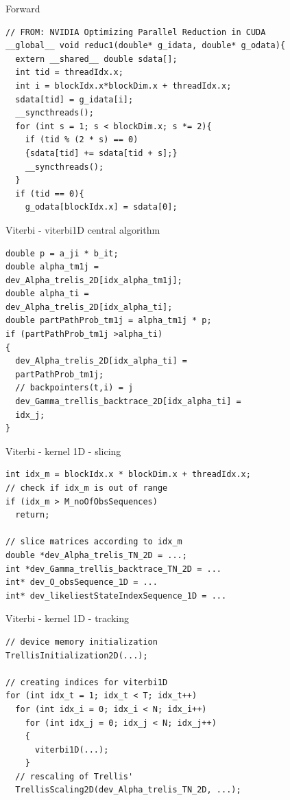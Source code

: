 \documentclass[11pt]{beamer}
\begin{document}
\begin{frame}[fragile]{Forward}
\begin{verbatim}
// FROM: NVIDIA Optimizing Parallel Reduction in CUDA
__global__ void reduc1(double* g_idata, double* g_odata){
  extern __shared__ double sdata[];
  int tid = threadIdx.x;
  int i = blockIdx.x*blockDim.x + threadIdx.x;
  sdata[tid] = g_idata[i];
  __syncthreads();
  for (int s = 1; s < blockDim.x; s *= 2){
    if (tid % (2 * s) == 0)
    {sdata[tid] += sdata[tid + s];}
    __syncthreads();
  }
  if (tid == 0){
    g_odata[blockIdx.x] = sdata[0];
\end{verbatim}
\end{frame}

\begin{frame}[fragile]{Viterbi - viterbi1D central algorithm}
\begin{verbatim}	
double p = a_ji * b_it;
double alpha_tm1j = 
dev_Alpha_trelis_2D[idx_alpha_tm1j];
double alpha_ti = 
dev_Alpha_trelis_2D[idx_alpha_ti];
double partPathProb_tm1j = alpha_tm1j * p;
if (partPathProb_tm1j >alpha_ti)
{
  dev_Alpha_trelis_2D[idx_alpha_ti] = 
  partPathProb_tm1j;
  // backpointers(t,i) = j
  dev_Gamma_trellis_backtrace_2D[idx_alpha_ti] = 
  idx_j;
}	
\end{verbatim}
\end{frame}

\begin{frame}[fragile]{Viterbi - kernel 1D - slicing}
\begin{verbatim}
int idx_m = blockIdx.x * blockDim.x + threadIdx.x;
// check if idx_m is out of range 
if (idx_m > M_noOfObsSequences)
  return;
  
// slice matrices according to idx_m
double *dev_Alpha_trelis_TN_2D = ...;
int *dev_Gamma_trellis_backtrace_TN_2D = ...
int* dev_O_obsSequence_1D = ...
int* dev_likeliestStateIndexSequence_1D = ...
\end{verbatim}
\end{frame}

\begin{frame}[fragile]{Viterbi - kernel 1D - tracking}
	\begin{verbatim}
// device memory initialization
TrellisInitialization2D(...);

// creating indices for viterbi1D
for (int idx_t = 1; idx_t < T; idx_t++)
  for (int idx_i = 0; idx_i < N; idx_i++)
    for (int idx_j = 0; idx_j < N; idx_j++)
    {
      viterbi1D(...);
    }
  // rescaling of Trellis'
  TrellisScaling2D(dev_Alpha_trelis_TN_2D, ...);

\end{verbatim}
\end{frame}
\end{document}
